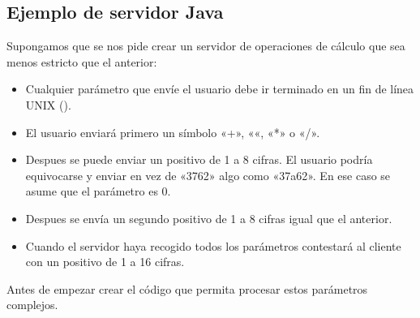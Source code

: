 \documentclass[letterpaper,10pt,spanish]{sphinxmanual}
\begin{document}
\subsection{Ejemplo de servidor Java}
\label{\detokenize{textos/tema3:ejemplo-de-servidor-java}}
Supongamos que se nos pide crear un servidor de operaciones de cálculo que sea menos estricto que el anterior:
\begin{itemize}
\item {} 
Cualquier parámetro que envíe el usuario debe ir terminado en un fin de línea UNIX ().

\item {} 
El usuario enviará primero un símbolo «+», «\sphinxhyphen{}«, «*» o «/».

\item {} 
Despues se puede enviar un positivo de 1 a 8 cifras. El usuario podría equivocarse y enviar en vez de «3762» algo como «37a62». En ese caso se asume que el parámetro es 0.

\item {} 
Despues se envía un segundo positivo de 1 a 8 cifras igual que el anterior.

\item {} 
Cuando el servidor haya recogido todos los parámetros contestará al cliente con un positivo de 1 a 16 cifras.

\end{itemize}

Antes de empezar crear el código que permita procesar estos parámetros complejos.
\end{document}
